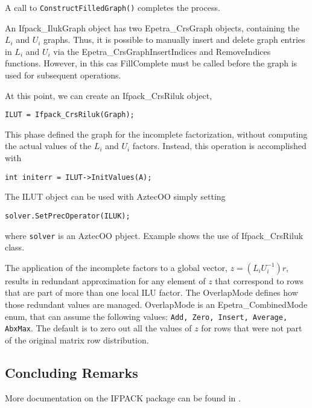 A call to \verb!ConstructFilledGraph()! completes the process.

\begin{remark}
  An Ifpack\_IlukGraph object has two Epetra\_CrsGraph objects,
  containing the $L_i$ and $U_i$ graphs. Thus, it is possible to
  manually insert and delete graph entries in $L_i$ and $U_i$ via the
  Epetra\_CrsGraphInsertIndices and RemoveIndices functions. However, in
  this cas FillComplete must be called before the graph is used for
  subsequent operations.
\end{remark}

At this point, we can create an Ifpack\_CrsRiluk object,
\begin{verbatim}
ILUT = Ifpack_CrsRiluk(Graph);
\end{verbatim}
This phase defined the graph for the incomplete factorization, without
computing the actual values of the $L_i$ and $U_i$ factors. Instead,
this operation is accomplished with
\begin{verbatim}
int initerr = ILUT->InitValues(A);
\end{verbatim}
The ILUT object can be used with AztecOO simply setting
\begin{verbatim}
solver.SetPrecOperator(ILUK);
\end{verbatim}
where \verb!solver! is an AztecOO pbject.
\smallskip
Example  shows the use of Ifpack\_CrsRiluk class.

\medskip

The application of the incomplete factors to a global vector, $z =
(L_iU_i^{-1}) r$, results in redundant approximation for any element of
$z$ that correspond to rows that are part of more than one local ILU
factor. The OverlapMode defines how those redundant values are managed.
OverlapMode is an Epetra\_CombinedMode enum, that can assume the
following values: {\tt Add, Zero, Insert, Average, AbxMax}. The default
is to zero out all the values of $z$ for rows that were not part of the
original matrix row distribution.




\subsection{Concluding Remarks}
\label{sec:ifpack_concluding}

More documentation on the IFPACK package can be found in
\cite{Ifpack-Ref-Guide,Ifpack-User-Guide}.

